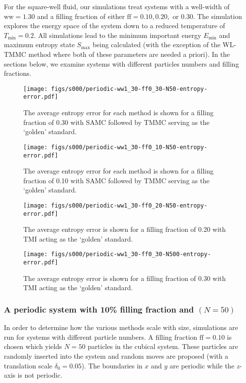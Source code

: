 \documentclass[letterpaper,twocolumn,amsmath,amssymb,pre,aps,10pt]{revtex4-1}
\begin{document}
For the square-well fluid, our simulations treat systems with a
well-width of $\text{ww} = 1.30$ and a filling fraction of either
$\text{ff} = 0.10, 0.20,$ or $0.30$.  The simulation explores the
energy space of the system down to a reduced temperature of
$T_{\text{min}} = 0.2$.  All simulations lead to the minimum important
energy $E_{\text{min}}$ and maximum entropy state $S_{\text{max}}$
being calculated (with the exception of the WL-TMMC method where both
of these parameters are needed a priori).  In the sections below, we
examine systems with different particles numbers and filling fractions.

\begin{figure}
  \texttt{[image: figs/s000/periodic-ww1\_30-ff0\_30-N50-entropy-error.pdf]}
  \caption{The average entropy error for each method is shown for a filling fraction of 0.30 with
  SAMC followed by TMMC serving as the `golden'
  standard.}\label{fig:N50-ff0.3-avg-error}
\end{figure}
\begin{figure}
  \texttt{[image: figs/s000/periodic-ww1\_30-ff0\_10-N50-entropy-error.pdf]}
  \caption{The average entropy error for each method is shown for a filling fraction of 0.10 with
  SAMC followed by TMMC serving as the `golden' standard.}\label{fig:N50-ff0.1-avg-error}
\end{figure}
\begin{figure}
  \texttt{[image: figs/s000/periodic-ww1\_30-ff0\_20-N50-entropy-error.pdf]}
  \caption{The average entropy error is shown for a filling fraction of 0.20 with TMI acting as the
  `golden' standard.}\label{fig:N50-ff0.2-avg-error}
\end{figure}
\begin{figure}
\texttt{[image: figs/s000/periodic-ww1\_30-ff0\_30-N500-entropy-error.pdf]}
  \caption{The average entropy error is shown for a filling fraction of 0.30 with TMI acting as the
  `golden' standard.}\label{fig:n500-ff0.2}
\end{figure}

\subsubsection{A periodic system with 10\% filling fraction and $(N = 50)$}
In order to determine how the various methods scale with size,
simulations are run for systems with different particle numbers. A filling
fraction $\text{ff} = 0.10$ is chosen which yields $N = 50$ particles
in the cubical system.  These particles are randomly inserted into the
system and random moves are proposed (with a translation scale
$\delta_0 = 0.05$). The boundaries in $x$ and $y$ are periodic while
the $z$-axis is not periodic.
\end{document}
